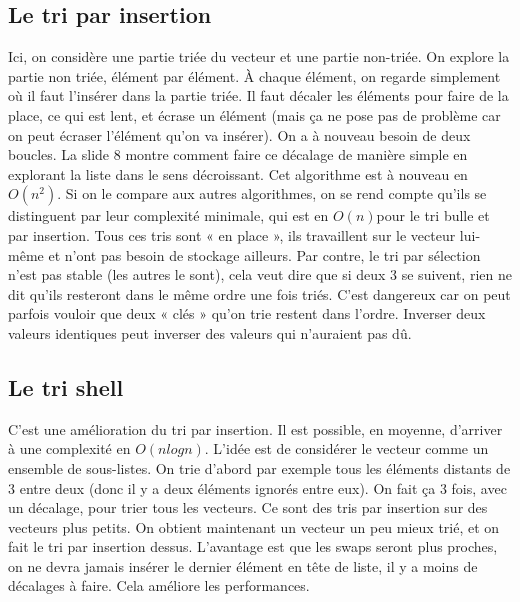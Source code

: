 \documentclass[10pt]{article}
\begin{document}
\subsection{Le tri par insertion}
Ici, on considère une partie triée du vecteur et une partie non-triée. On explore la partie non triée, élément par élément. À chaque élément, on regarde simplement où il faut l'insérer dans la partie triée. Il faut décaler les éléments pour faire de la place, ce qui est lent, et écrase un élément (mais ça ne pose pas de problème car on peut écraser l'élément qu'on va insérer). 
\newline \newline 
On a à nouveau besoin de deux boucles. La slide 8 montre comment faire ce décalage de manière simple en explorant la liste dans le sens décroissant.  
\newline \newline 
Cet algorithme est à nouveau en $O(n^2)$. Si on le compare aux autres algorithmes, on se rend compte qu'ils se distinguent par leur complexité minimale, qui est en $O(n) $pour le tri bulle et par insertion. Tous ces tris sont « en place », ils travaillent sur le vecteur lui-même et n'ont pas besoin de stockage ailleurs. Par contre, le tri par sélection n'est pas stable (les autres le sont), cela veut dire que si deux 3 se suivent, rien ne dit qu'ils resteront dans le même ordre une fois triés. C'est dangereux car on peut parfois vouloir que deux « clés » qu'on trie restent dans l'ordre. Inverser deux valeurs identiques peut inverser des valeurs qui n'auraient pas dû.
\subsection{Le tri shell}
C'est une amélioration du tri par insertion. Il est possible, en moyenne, d'arriver à une complexité en $O(n log n)$. L'idée est de considérer le vecteur comme un ensemble de sous-listes. On trie d'abord par exemple tous les éléments distants de 3 entre deux (donc il y a deux éléments ignorés entre eux). On fait ça 3 fois, avec un décalage, pour trier tous les vecteurs. Ce sont des tris par insertion sur des vecteurs plus petits. 
\newline \newline 
On obtient maintenant un vecteur un peu mieux trié, et on fait le tri par insertion dessus. L'avantage est que les swaps seront plus proches, on ne devra jamais insérer le dernier élément en tête de liste, il y a moins de décalages à faire. Cela améliore les performances. 
\end{document}
